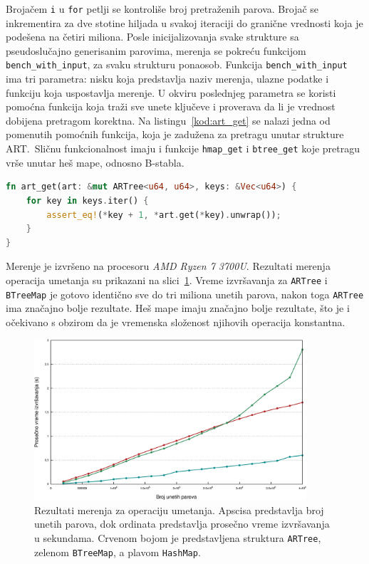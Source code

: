 \documentclass[12pt,oneside]{memoir}
\begin{document}
Brojačem \texttt{i} u \texttt{for} petlji se kontroliše broj pretraženih
parova. Brojač se inkrementira za dve stotine hiljada u svakoj iteraciji do
granične vrednosti koja je podešena na četiri miliona.
Posle inicijalizovanja svake strukture sa pseudoslučajno generisanim parovima,
merenja se pokreću funkcijom \texttt{bench\_with\_input}, za svaku strukturu
ponaosob. Funkcija \texttt{bench\_with\_input} ima tri parametra: nisku koja
predstavlja naziv merenja, ulazne podatke i funkciju koja uspostavlja merenje.
U okviru poslednjeg parametra se koristi pomoćna funkcija koja traži sve
unete ključeve i proverava da li je vrednost dobijena pretragom
korektna. Na listingu~\ref{kod:art_get} se nalazi jedna od pomenutih
pomoćnih funkcija, koja je
zadužena za pretragu unutar strukture ART.\ Sličnu funkcionalnost imaju i
funkcije \texttt{hmap\_get} i \texttt{btree\_get} koje pretragu vrše
unutar heš mape, odnosno B-stabla.

\begin{lstlisting}[language=Rust,
                   caption={Funkcija \texttt{art\_get}},
                   label={kod:art_get}]
fn art_get(art: &mut ARTree<u64, u64>, keys: &Vec<u64>) {
    for key in keys.iter() {
        assert_eq!(*key + 1, *art.get(*key).unwrap());
    }
}
\end{lstlisting}

Merenje je izvršeno na procesoru \textit{AMD Ryzen 7 3700U}. Rezultati merenja
operacija umetanja su prikazani na slici~\ref{fig:bench_insert}.
Vreme izvršavanja za \texttt{ARTree} i \texttt{BTreeMap} je gotovo identično
sve do tri miliona unetih parova, nakon toga \texttt{ARTree} ima značajno
bolje rezultate. Heš mape imaju značajno bolje rezultate, što je i očekivano
s obzirom da je vremenska složenost njihovih operacija konstantna.

\begin{figure}[!h]
  \centering
  \includegraphics[width=0.90\textwidth]{lines_insert.eps}
  \caption{
    Rezultati merenja za operaciju umetanja. Apscisa predstavlja broj
    unetih parova, dok ordinata predstavlja prosečno vreme izvršavanja u sekundama.
    Crvenom bojom je predstavljena struktura
    \texttt{ARTree}, zelenom \texttt{BTreeMap}, a plavom \texttt{HashMap}.
  }
  \label{fig:bench_insert}
\end{figure}
\end{document}
